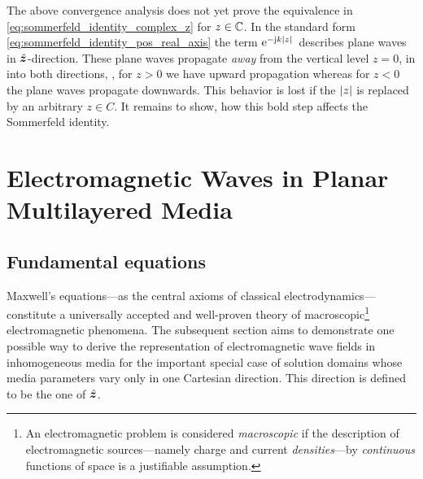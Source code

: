 The above convergence analysis does not yet prove the equivalence in
\eqref{eq:sommerfeld_identity_complex_z} for $z \in \mathbb{C}$.
In the standard form \eqref{eq:sommerfeld_identity_pos_real_axis} the term
$\mathrm{e}^{-\mathrm{j} k \left\vert z\right\vert}\,$ describes plane waves in $\uv{z}$-direction.
These plane waves propagate \emph{away} from the vertical level $z = 0$, in
into both directions, \ie, for $z > 0$ we have upward propagation whereas
for $z < 0$ the plane waves propagate downwards.
This behavior is lost if the $\left\vert z\right\vert$ is replaced by an arbitrary $z \in C$.
It remains to show, how this bold step affects the Sommerfeld identity.







\chapter{Electromagnetic Waves in Planar Multilayered Media}
\label{ch:em_case}







\section{Fundamental equations}
\label{sec:em_fundamental_equations}

Maxwell's equations---as the central axioms of classical
electrodynamics---constitute a universally accepted and well-proven theory
of macroscopic\footnote{An electromagnetic problem is considered
\emph{macroscopic} if the description of electromagnetic sources---namely
charge and current \emph{densities}---by \emph{continuous} functions of
space is a justifiable assumption.} electromagnetic phenomena.
The subsequent section aims to demonstrate one possible way to derive the
representation of electromagnetic wave fields in inhomogeneous media for the
important special case of solution domains whose media parameters vary only in
one Cartesian direction.
This direction is defined to be the one of $\uv{z}$.

